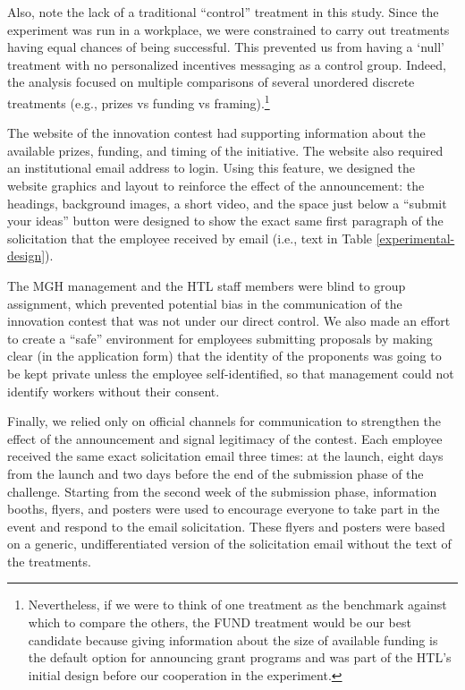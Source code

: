 \documentclass[12pt, titlepage]{article}
\begin{document}
Also, note the lack of a traditional ``control'' treatment in this
study. Since the experiment was run in a workplace, we were constrained
to carry out treatments having equal chances of being successful. This
prevented us from having a `null' treatment with no personalized
incentives messaging as a control group. Indeed, the analysis focused on
multiple comparisons of several unordered discrete treatments (e.g.,
prizes vs funding vs framing).\footnote{Nevertheless, if we were to
  think of one treatment as the benchmark against which to compare the
  others, the FUND treatment would be our best candidate because giving
  information about the size of available funding is the default option
  for announcing grant programs and was part of the HTL's initial design
  before our cooperation in the experiment.}

The website of the innovation contest had supporting information about
the available prizes, funding, and timing of the initiative. The website
also required an institutional email address to login. Using this
feature, we designed the website graphics and layout to reinforce the
effect of the announcement: the headings, background images, a short
video, and the space just below a ``submit your ideas'' button were
designed to show the exact same first paragraph of the solicitation that
the employee received by email (i.e., text in Table
\ref{experimental-design}).

The MGH management and the HTL staff members were blind to group
assignment, which prevented potential bias in the communication of the
innovation contest that was not under our direct control. We also made
an effort to create a ``safe'' environment for employees submitting
proposals by making clear (in the application form) that the identity of
the proponents was going to be kept private unless the employee
self-identified, so that management could not identify workers without
their consent.

Finally, we relied only on official channels for communication to
strengthen the effect of the announcement and signal legitimacy of the
contest. Each employee received the same exact solicitation email three
times: at the launch, eight days from the launch and two days before the
end of the submission phase of the challenge. Starting from the second
week of the submission phase, information booths, flyers, and posters
were used to encourage everyone to take part in the event and respond to
the email solicitation. These flyers and posters were based on a
generic, undifferentiated version of the solicitation email without the
text of the treatments.
\end{document}
